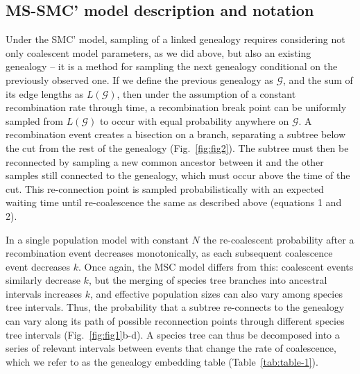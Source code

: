 \documentclass[11pt]{article}
\begin{document}

\subsection{MS-SMC' model description and notation}

Under the SMC' model, sampling of a linked genealogy requires considering not only 
coalescent model parameters, 
as we did above, but also an existing genealogy -- it is a method 
for sampling the next genealogy conditional on the previously observed one. 
If we define the previous genealogy as $\mathcal{G}$, and the sum of its edge lengths 
as $L(\mathcal{G})$, then under the assumption of a constant recombination rate through time,
a recombination break point can be uniformly sampled from $L(\mathcal{G})$ to occur with 
equal probability anywhere on $\mathcal{G}$. 
A recombination event creates 
a bisection on a branch, separating a subtree below the cut 
from the rest of the genealogy (Fig.~\ref{fig:fig2}). 
The subtree must then be reconnected by sampling a new common 
ancestor between it and the other samples still connected to the genealogy, which 
must occur above the time of the cut. This re-connection point is sampled 
probabilistically with an expected waiting time until re-coalescence the 
same as described above (equations 1 and 2).

In a single population model with constant $N$ the re-coalescent probability
after a recombination event decreases monotonically, as each subsequent 
coalescence event decreases $k$.
Once again, the MSC model 
differs from this: coalescent events similarly decrease $k$, but the merging of 
species tree branches into ancestral intervals increases $k$, and effective population 
sizes can also vary among species tree intervals. 
Thus, the probability that a subtree re-connects to the genealogy can vary 
along its path of possible reconnection points through 
different species tree intervals
(Fig.~\ref{fig:fig1}b-d). 
A species tree can thus be decomposed into a series of relevant intervals 
between events that change the rate of coalescence,
which we refer to as the genealogy embedding table (Table~\ref{tab:table-1}). 
\end{document}
